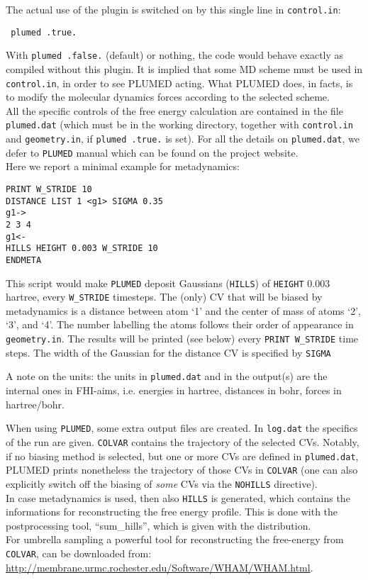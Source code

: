 The actual use of the plugin is switched on by this single line in \texttt{control.in}:
\begin{verbatim}
 plumed .true.
\end{verbatim}
With \texttt{plumed .false.} (default) or nothing, the code would behave exactly as compiled without
this plugin. It is implied that some MD scheme must be used in \texttt{control.in}, in order to see PLUMED acting. What PLUMED does, in facts, is to modify the molecular dynamics forces according to the selected scheme.\\
All the specific controls of the free energy calculation are contained in the file \texttt{plumed.dat} (which must be in the working directory, together with \texttt{control.in} and \texttt{geometry.in}, if \texttt{plumed .true.} is set).
For all the details on \texttt{plumed.dat}, we defer to \texttt{PLUMED} manual which can be found on the project website.\\
Here we report a minimal example for metadynamics:
\begin{verbatim}
PRINT W_STRIDE 10
DISTANCE LIST 1 <g1> SIGMA 0.35
g1->
2 3 4
g1<-
HILLS HEIGHT 0.003 W_STRIDE 10
ENDMETA
\end{verbatim}
This script would make \texttt{PLUMED} deposit Gaussians (\texttt{HILLS}) of \texttt{HEIGHT} $0.003$ hartree, every \texttt{W\_STRIDE} timesteps.
The (only) CV that will be biased by metadynamics is a distance between atom `1' and the center of mass of atoms `2', `3', and `4'. The number labelling the atoms follows their order of appearance in \texttt{geometry.in}. The results will be printed (see below) every \texttt{PRINT W\_STRIDE} time steps.
The width of the Gaussian for the distance CV is specified by \texttt{SIGMA}

A note on the units: the units in \texttt{plumed.dat} and in the output(s) are the internal ones in FHI-aims, i.e. energies in hartree, distances in bohr, forces in hartree/bohr.

When using \texttt{PLUMED}, some extra output files are created. 
In \texttt{log.dat} the specifics of the run are given. \texttt{COLVAR} contains the trajectory of
the selected CVs. 
Notably, if no biasing method is selected, but one or more CVs are defined in \texttt{plumed.dat}, PLUMED prints nonetheless the trajectory of those CVs in \texttt{COLVAR} (one can also explicitly switch off the biasing of \textit{some} CVs via the \texttt{NOHILLS} directive).\\
In case metadynamics is used, then also \texttt{HILLS} is generated, which contains the informations for reconstructing the free energy profile. This is done with the postprocessing tool, ``sum\_hills'', which is given with the distribution. \\
For umbrella sampling a powerful tool for reconstructing the free-energy from
\texttt{COLVAR}, can be downloaded from: \url{http://membrane.urmc.rochester.edu/Software/WHAM/WHAM.html}.





